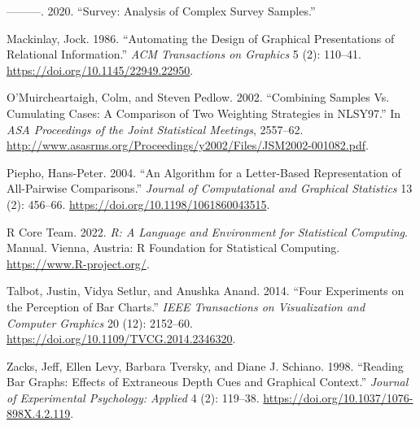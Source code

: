 \documentclass[
]{jds}
\newlength{\cslhangindent}
\newlength{\cslentryspacingunit} %
\newenvironment{CSLReferences}[2] %
 {%
  \setlength{\parindent}{0pt}
  \ifodd #1
  \let\oldpar\par
  \def\par{\hangindent=\cslhangindent\oldpar}
  \fi
  \setlength{\parskip}{#2\cslentryspacingunit}
 }%
 {}
\begin{document}
\begin{CSLReferences}{1}{0}
\leavevmode{}%
---------. 2020. {``Survey: Analysis of Complex Survey Samples.''}

\leavevmode{}%
Mackinlay, Jock. 1986. {``Automating the Design of Graphical
Presentations of Relational Information.''} \emph{ACM Transactions on
Graphics} 5 (2): 110--41. \url{https://doi.org/10.1145/22949.22950}.

\leavevmode{}%
O'Muircheartaigh, Colm, and Steven Pedlow. 2002. {``Combining {Samples
Vs}. {Cumulating Cases}: {A Comparison} of {Two Weighting Strategies} in
{NLSY97}.''} In \emph{{ASA Proceedings} of the {Joint Statistical
Meetings}}, 2557--62.
\url{http://www.asasrms.org/Proceedings/y2002/Files/JSM2002-001082.pdf}.

\leavevmode{}%
Piepho, Hans-Peter. 2004. {``An {Algorithm} for a {Letter-Based
Representation} of {All-Pairwise Comparisons}.''} \emph{Journal of
Computational and Graphical Statistics} 13 (2): 456--66.
\url{https://doi.org/10.1198/1061860043515}.

\leavevmode{}%
R Core Team. 2022. \emph{R: {A} Language and Environment for Statistical
Computing}. Manual. {Vienna, Austria}: {R Foundation for Statistical
Computing}. \url{https://www.R-project.org/}.

\leavevmode{}%
Talbot, Justin, Vidya Setlur, and Anushka Anand. 2014. {``Four
{Experiments} on the {Perception} of {Bar Charts}.''} \emph{IEEE
Transactions on Visualization and Computer Graphics} 20 (12): 2152--60.
\url{https://doi.org/10.1109/TVCG.2014.2346320}.

\leavevmode{}%
Zacks, Jeff, Ellen Levy, Barbara Tversky, and Diane J. Schiano. 1998.
{``Reading Bar Graphs: {Effects} of Extraneous Depth Cues and Graphical
Context.''} \emph{Journal of Experimental Psychology: Applied} 4 (2):
119--38. \url{https://doi.org/10.1037/1076-898X.4.2.119}.

\end{CSLReferences}
\end{document}
